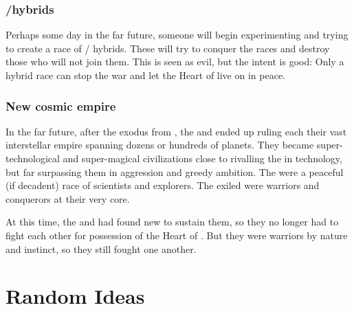 \subsection{\Resphan/\dragon hybrids}
Perhaps some day in the far future, someone will begin experimenting and trying to create a race of \resphan/\dragon{} hybrids. 
These will try to conquer the races and destroy those who will not join them. 
This is seen as evil, but the intent is good: 
Only a hybrid race can stop the war and let the Heart of \Miith{} live on in peace. 









\subsection{New cosmic empire}
In the far future, after the exodus from \Miith, the \dragons and \resphain ended up ruling each their vast interstellar empire spanning dozens or hundreds of planets. 
They became super-technological and super-magical civilizations close to rivalling the \voyagers in technology, but far surpassing them in aggression and greedy ambition. 
The \voyagers were a peaceful (if decadent) race of scientists and explorers. 
The exiled \Miithians were warriors and conquerors at their very core.

At this time, the \dragons and \resphain had found new \dweomers to sustain them, so they no longer had to fight each other for possession of the Heart of \Miith. 
But they were warriors by nature and instinct, so they still fought one another. 























\chapter{Random Ideas}












